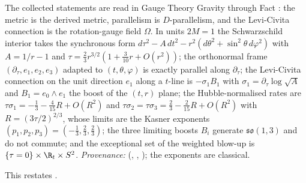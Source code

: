 The collected statements are read in Gauge Theory Gravity through Fact : the metric is the derived metric, parallelism is $D$-parallelism, and the Levi-Civita connection is the rotation-gauge field $\Omega$. In units $2M = 1$ the Schwarzschild interior takes the synchronous form $d\tau^2 - A\,dt^2 - r^2(d\theta^{2} + \sin^{2}\theta\,d\varphi^{2})$ with $A = 1/r - 1$ and $\tau = \tfrac23 r^{3/2}(1 + \tfrac{3}{10}r + O(r^2))$; the orthonormal frame $(\partial_\tau, e_1, e_2, e_3)$ adapted to $(t, \theta, \varphi)$ is exactly parallel along $\partial_\tau$; the Levi-Civita connection on the unit direction $e_1$ along a $t$-line is $-\sigma_1 B_1$ with $\sigma_1 = \partial_\tau \log\sqrt{A}$ and $B_1 = e_0 \wedge e_1$ the boost of the $(t, r)$ plane; the Hubble-normalised rates are $\tau\sigma_1 = -\tfrac13 - \tfrac{4}{15}R + O(R^2)$ and $\tau\sigma_2 = \tau\sigma_3 = \tfrac23 - \tfrac{2}{15}R + O(R^2)$ with $R = (3\tau/2)^{2/3}$, whose limits are the Kasner exponents $(p_1, p_2, p_3) = (-\tfrac13, \tfrac23, \tfrac23)$; the three limiting boosts $B_i$ generate $\mathfrak{so}(1,3)$ and do not commute; and the exceptional set of the weighted blow-up is $\{\tau = 0\} \times \R_t \times S^2$. \emph{Provenance:} \cite[Lemmas 5.1 to 5.3, Def.~5.5, Thm.~5.6]{ButlerT6} (, , ); the exponents are classical.

This restates .
